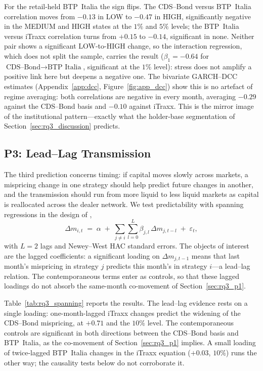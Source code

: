 For the retail-held BTP~Italia the sign flips. The CDS--Bond versus
BTP~Italia correlation moves from $-0.13$ in LOW to $-0.47$ in HIGH,
significantly negative in the MEDIUM and HIGH states at the $1\%$ and
$5\%$ levels; the BTP~Italia versus iTraxx correlation turns from
$+0.15$ to $-0.14$, significant in none. Neither pair shows a
significant LOW-to-HIGH change, so the interaction regression, which
does not split the sample, carries the result
($\beta_{1} = -0.64$ for
$\textrm{CDS--Bond}\rightarrow\textrm{BTP~Italia}$, significant at the
$1\%$ level): stress does not amplify a positive link here but deepens
a negative one. The bivariate GARCH--DCC estimates
(Appendix~\ref{app:dcc}, Figure~\ref{fig:app_dcc}) show this is no
artefact of regime averaging: both correlations are negative in every
month, averaging $-0.29$ against the CDS--Bond basis and $-0.10$
against iTraxx. This is the mirror image of the institutional
pattern---exactly what the holder-base segmentation of
Section~\ref{sec:rq3_discussion} predicts.


\subsection{P3: Lead--Lag Transmission}
\label{sec:rq3_p3}

The third prediction concerns timing: if capital moves slowly across
markets, a mispricing change in one strategy should help predict
future changes in another, and the transmission should run from more
liquid to less liquid markets as capital is reallocated across the
dealer network. We test predictability with spanning regressions in
the design of \citet{fleckenstein2014tips},
\begin{equation}\label{eq:spanning}
  \Delta m_{i,t} \;=\; \alpha
  \;+\; \sum_{j \neq i} \sum_{l=0}^{L} \beta_{j,l}\, \Delta m_{j,t-l}
  \;+\; \varepsilon_t,
\end{equation}
with $L = 2$ lags and Newey--West HAC standard errors. The objects of
interest are the lagged coefficients: a significant loading on
$\Delta m_{j,t-1}$ means that last month's mispricing in strategy $j$
predicts this month's in strategy $i$---a lead--lag relation. The
contemporaneous terms enter as controls, so that these lagged loadings
do not absorb the same-month co-movement of Section~\ref{sec:rq3_p1}.

Table~\ref{tab:rq3_spanning} reports the results. The lead--lag
evidence rests on a single loading: one-month-lagged iTraxx changes
predict the widening of the CDS--Bond mispricing, at $+0.71$ and the
$10\%$ level. The contemporaneous controls are significant in both
directions between the CDS--Bond basis and BTP~Italia, as the
co-movement of Section~\ref{sec:rq3_p1} implies. A small loading of
twice-lagged BTP~Italia
changes in the iTraxx equation ($+0.03$, $10\%$) runs the other way;
the causality tests below do not corroborate it.

